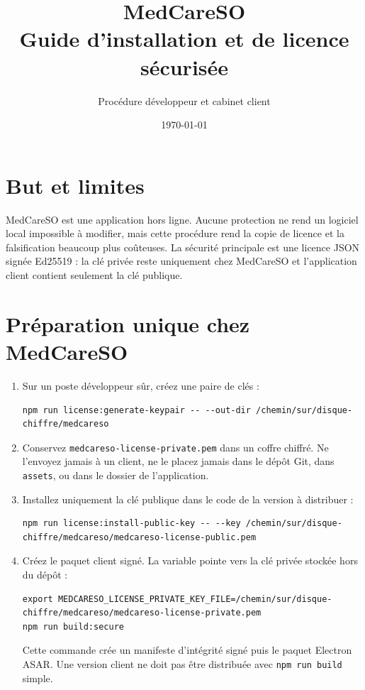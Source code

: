 \documentclass[11pt,a4paper]{article}
\title{MedCareSO\\Guide d'installation et de licence sécurisée}
\author{Procédure développeur et cabinet client}
\date{\today}
\begin{document}
\maketitle

\section*{But et limites}
MedCareSO est une application hors ligne. Aucune protection ne rend un logiciel
local impossible à modifier, mais cette procédure rend la copie de licence et
la falsification beaucoup plus coûteuses. La sécurité principale est une
licence JSON signée Ed25519 : la clé privée reste uniquement chez MedCareSO et
l'application client contient seulement la clé publique.

\section{Préparation unique chez MedCareSO}
\begin{enumerate}[label=\arabic*.]
  \item Sur un poste développeur sûr, créez une paire de clés :
\begin{verbatim}
npm run license:generate-keypair -- --out-dir /chemin/sur/disque-chiffre/medcareso
\end{verbatim}
  \item Conservez \texttt{medcareso-license-private.pem} dans un coffre chiffré.
  Ne l'envoyez jamais à un client, ne le placez jamais dans le dépôt Git, dans
  \texttt{assets}, ou dans le dossier de l'application.
  \item Installez uniquement la clé publique dans le code de la version à
  distribuer :
\begin{verbatim}
npm run license:install-public-key -- --key /chemin/sur/disque-chiffre/medcareso/medcareso-license-public.pem
\end{verbatim}
  \item Créez le paquet client signé. La variable pointe vers la clé privée
  stockée hors du dépôt :
\begin{verbatim}
export MEDCARESO_LICENSE_PRIVATE_KEY_FILE=/chemin/sur/disque-chiffre/medcareso/medcareso-license-private.pem
npm run build:secure
\end{verbatim}
Cette commande crée un manifeste d'intégrité signé puis le paquet Electron
ASAR. Une version client ne doit pas être distribuée avec \texttt{npm run build}
simple.
\end{enumerate}
\end{document}
